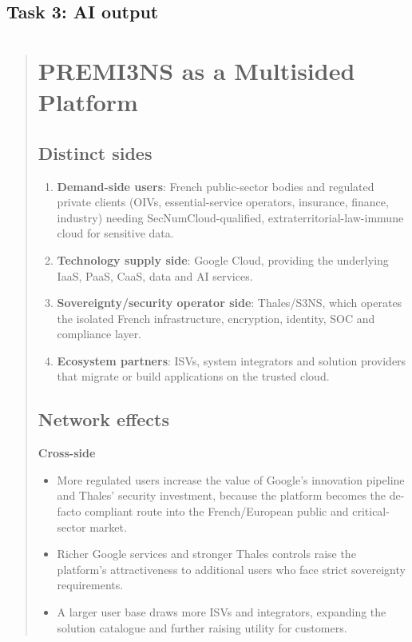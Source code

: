 \subsection{Task 3: AI output}
\begin{quote}\small
\section*{PREMI3NS as a Multisided Platform}

\subsection*{Distinct sides}
\begin{enumerate}
    \item \textbf{Demand-side users}: French public-sector bodies and regulated private clients (OIVs, essential-service operators, insurance, finance, industry) needing SecNumCloud-qualified, extraterritorial-law-immune cloud for sensitive data.
    \item \textbf{Technology supply side}: Google Cloud, providing the underlying IaaS, PaaS, CaaS, data and AI services.
    \item \textbf{Sovereignty/security operator side}: Thales/S3NS, which operates the isolated French infrastructure, encryption, identity, SOC and compliance layer.
    \item \textbf{Ecosystem partners}: ISVs, system integrators and solution providers that migrate or build applications on the trusted cloud.
\end{enumerate}

\subsection*{Network effects}

\textbf{Cross-side}
\begin{itemize}
    \item More regulated users increase the value of Google’s innovation pipeline and Thales’ security investment, because the platform becomes the de-facto compliant route into the French/European public and critical-sector market.
    \item Richer Google services and stronger Thales controls raise the platform’s attractiveness to additional users who face strict sovereignty requirements.
    \item A larger user base draws more ISVs and integrators, expanding the solution catalogue and further raising utility for customers.
\end{itemize}


\end{quote}

